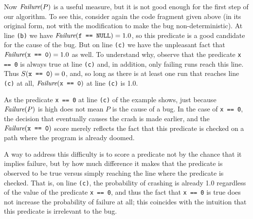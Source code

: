 
Now $\textit{Failure}(P)$ is a useful measure, but it is not good
enough for the first step of our algorithm. To see this, consider again the
code fragment given above (in its original form, not with the
modification to make the bug non-deterministic).  At line {\tt (b)} we
have $\textit{Failure}(\mbox{\tt f == NULL}) = 1.0$, so this predicate is a good
candidate for the cause of the bug.
But on line {\tt (c)} we have the unpleasant fact that $\textit{Failure}(\mbox{\tt x == 0}) = 1.0$ as well.
To understand why, observe that the 
predicate \texttt{x == 0} is always true at line {\tt (c)} and, in
addition,
only failing runs reach this line.
Thus $S(\mbox{\tt x == 0}) = 0$, and, so long as there is at least one run that
reaches line {\tt (c)} at all, $\textit{Failure}(\mbox{\tt x == 0})$ at line {\tt (c)} is 1.0.

As the predicate {\tt x == 0} at line {\tt (c)} of the example
shows, just because $\textit{Failure}(P)$ is high does not
mean $P$ is the cause of a bug.  In the case of {\tt x == 0}, the
decision that eventually causes the crash is made earlier, and the
$\textit{Failure}(\mbox{\tt x == 0})$ score merely reflects the fact that this
predicate is checked on a path where the program is already doomed.


A way to address this difficulty is to score a predicate not by the chance
that it implies failure, but by how much difference it makes that the predicate
is observed to be true versus simply reaching the line where the predicate is checked.
That is, on line {\tt (c)}, the probability of crashing is already 1.0 regardless
of the value of the predicate {\tt x == 0}, and thus the fact that {\tt x == 0} is
true does not increase the probability of failure at all; this coincides with
the intuition that this predicate is irrelevant to the bug.

